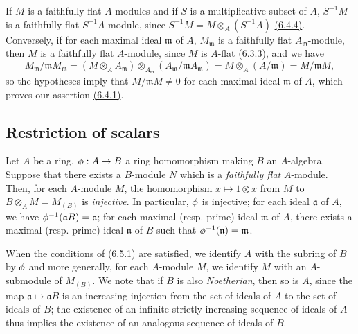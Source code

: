 \begin{env}[6.4.5]
\label{0.6.4.5}
If $M$ is a faithfully flat $A$-modules and if $S$ is a multiplicative subset of $A$,
$S^{-1}M$ is a faithfully flat $S^{-1}A$-module, since $S^{-1}M=M\otimes_A(S^{-1}A)$
\hyperref[0.6.4.4]{(6.4.4)}. Conversely, if for each maximal ideal $\mathfrak{m}$ of $A$,
$M_\mathfrak{m}$ is a faithfully flat $A_\mathfrak{m}$-module, then $M$ is a faithfully flat
$A$-module, since $M$ is $A$-flat \hyperref[0.6.3.3]{(6.3.3)}, and we have
\[
  M_\mathfrak{m}/\mathfrak{m}M_\mathfrak{m}
  =(M\otimes_A A_\mathfrak{m})
  \otimes_{A_\mathfrak{m}}(A_\mathfrak{m}/\mathfrak{m}A_\mathfrak{m})
  =M\otimes_A(A/\mathfrak{m})=M/\mathfrak{m}M,
\]
so the hypotheses imply that $M/\mathfrak{m}M\neq 0$ for each maximal ideal $\mathfrak{m}$ of
$A$, which proves our assertion \hyperref[0.6.4.1]{(6.4.1)}.
\end{env}

\subsection{Restriction of scalars}
\label{subsection-restriction-of-scalars}

\begin{env}[6.5.1]
\label{0.6.5.1}
Let $A$ be a ring, $\phi:A\to B$ a ring homomorphism making $B$ an $A$-algebra. Suppose that
there exists a $B$-module $N$ which is a {\em faithfully flat} $A$-module. Then, for each
$A$-module $M$, the homomorphism $x\mapsto 1\otimes x$ from $M$ to $B\otimes_A M=M_{(B)}$ is
{\em injective}. In particular, $\phi$ is injective; for each ideal $\mathfrak{a}$ of $A$,
we have $\phi^{-1}(\mathfrak{a}B)=\mathfrak{a}$; for each maximal (resp. prime) ideal
$\mathfrak{m}$ of $A$, there exists a maximal (resp. prime) ideal $\mathfrak{n}$ of $B$ such
that $\phi^{-1}(\mathfrak{n})=\mathfrak{m}$.
\end{env}

\begin{env}[6.5.2]
\label{0.6.5.2}
When the conditions of \hyperref[0.6.5.1]{(6.5.1)} are satisfied, we identify $A$ with the subring of
$B$ by $\phi$ and more generally, for each $A$-module $M$, we identify $M$ with an
$A$-submodule of $M_{(B)}$. We note that if $B$ is also {\em Noetherian}, then so is $A$,
since the map $\mathfrak{a}\mapsto\mathfrak{a}B$ is an increasing injection from the set of
ideals of $A$ to the set of ideals of $B$; the existence of an infinite strictly increasing
sequence of ideals of $A$ thus implies the existence of an analogous sequence of ideals of
$B$.
\end{env}

